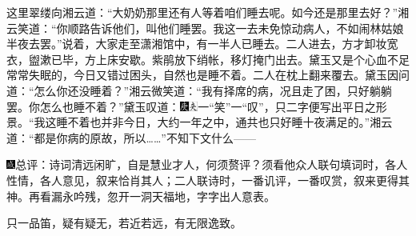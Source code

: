 这里翠缕向湘云道：``大奶奶那里还有人等着咱们睡去呢。如今还是那里去好？''湘云笑道：``你顺路告诉他们，叫他们睡罢。我这一去未免惊动病人，不如闹林姑娘半夜去罢。''说着，大家走至潇湘馆中，有一半人已睡去。二人进去，方才卸妆宽衣，盥漱已毕，方上床安歇。紫鹃放下绡帐，移灯掩门出去。黛玉又是个心血不足常常失眠的，今日又错过困头，自然也是睡不着。二人在枕上翻来覆去。黛玉因问道：``怎么你还没睡着？''湘云微笑道：``我有择席的病，况且走了困，只好躺躺罢。你怎么也睡不着？''黛玉叹道：{\includegraphics[width=3mm]{../Images/00004}\includegraphics[width=3mm]{../Images/00012}\footnotesize \kaishu 一``笑''一``叹''，只二字便写出平日之形景。}``我这睡不着也并非今日，大约一年之中，通共也只好睡十夜满足的。''湘云道：``都是你病的原故，所以\ldots{}\ldots{}''不知下文什么------

{\includegraphics[width=3mm]{../Images/00005}\kaishu 总评：诗词清远闲旷，自是慧业才人，何须赘评？须看他众人联句填词时，各人性情，各人意见，叙来恰肖其人；二人联诗时，一番讥评，一番叹赏，叙来更得其神。再看漏永吟残，忽开一洞天福地，字字出人意表。}

{\kaishu 只一品笛，疑有疑无，若近若远，有无限逸致。}



